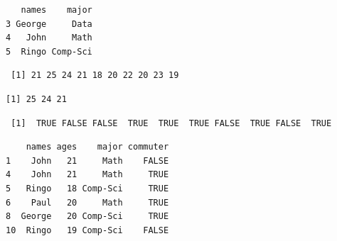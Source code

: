 \documentclass[
  letterpaper,
  DIV=11,
  numbers=noendperiod]{scrreprt}
\newenvironment{Shaded}{\begin{snugshade}}{\end{snugshade}}
\newcommand{\CommentTok}[1]{\textcolor[rgb]{0.37,0.37,0.37}{#1}}
\newcommand{\DecValTok}[1]{\textcolor[rgb]{0.68,0.00,0.00}{#1}}
\newcommand{\NormalTok}[1]{\textcolor[rgb]{0.00,0.23,0.31}{#1}}
\newcommand{\SpecialCharTok}[1]{\textcolor[rgb]{0.37,0.37,0.37}{#1}}
\begin{document}
\begin{verbatim}
   names    major
3 George     Data
4   John     Math
5  Ringo Comp-Sci
\end{verbatim}

\begin{Shaded}
\end{Shaded}

\begin{verbatim}
 [1] 21 25 24 21 18 20 22 20 23 19
\end{verbatim}

\begin{Shaded}
\end{Shaded}

\begin{verbatim}
[1] 25 24 21
\end{verbatim}

\begin{Shaded}
\end{Shaded}

\begin{verbatim}
 [1]  TRUE FALSE FALSE  TRUE  TRUE  TRUE FALSE  TRUE FALSE  TRUE
\end{verbatim}

\begin{Shaded}
\end{Shaded}

\begin{verbatim}
    names ages    major commuter
1    John   21     Math    FALSE
4    John   21     Math     TRUE
5   Ringo   18 Comp-Sci     TRUE
6    Paul   20     Math     TRUE
8  George   20 Comp-Sci     TRUE
10  Ringo   19 Comp-Sci    FALSE
\end{verbatim}
\end{document}
